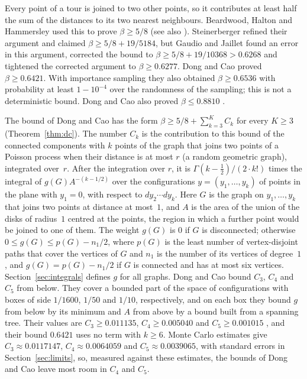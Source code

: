 \documentclass[11pt]{amsart}
\theoremstyle{definition}
\theoremstyle{remark}
\numberwithin{equation}{section}
\newcommand{\MCThree}{0.0117147}
\newcommand{\MCFour}{0.0064059}
\newcommand{\MCFive}{0.0039065}
\begin{document}
Every point of a tour is joined to two other points, so it contributes at least half the sum of the distances to its two nearest neighbours. Beardwood, Halton and Hammersley used this to prove $\beta\ge5/8$ \cite{BHH59} (see also \cite[Section~3.1]{Ste15}). Steinerberger \cite{Ste15} refined their argument and claimed $\beta\ge5/8+19/5184$, but Gaudio and Jaillet \cite{GJ20} found an error in this argument, corrected the bound to $\beta\ge5/8+19/10368>0.6268$ and tightened the corrected argument to $\beta\ge0.6277$. Dong and Cao \cite{DC26} proved $\beta\ge0.6421$. With importance sampling they also obtained $\beta\ge0.6536$ with probability at least $1-10^{-4}$ over the randomness of the sampling; this is not a deterministic bound. Dong and Cao also proved $\beta\le0.8810$ \cite{DC26}.

The bound of Dong and Cao has the form $\beta\ge5/8+\sum_{k=3}^{K}C_k$ for every $K\ge3$ (Theorem~\ref{thm:dc}). The number $C_k$ is the contribution to this bound of the connected components with $k$ points of the graph that joins two points of a Poisson process when their distance is at most $r$ (a random geometric graph), integrated over~$r$. After the integration over $r$, it is $\Gamma(k-\frac12)/(2\cdot k!)$ times the integral of $g(G)A^{-(k-1/2)}$ over the configurations $y=(y_1,\dots,y_k)$ of points in the plane with $y_1=0$, with respect to $dy_2\cdots dy_k$. Here $G$ is the graph on $y_1,\dots,y_k$ that joins two points at distance at most~$1$, and $A$ is the area of the union of the disks of radius~$1$ centred at the points, the region in which a further point would be joined to one of them. The weight $g(G)$ is $0$ if $G$ is disconnected; otherwise $0\le g(G)\le p(G)-n_1/2$, where $p(G)$ is the least number of vertex-disjoint paths that cover the vertices of $G$ and $n_1$ is the number of its vertices of degree~$1$, and $g(G)=p(G)-n_1/2$ if $G$ is connected and has at most six vertices. Section~\ref{sec:integrals} defines $g$ for all graphs. Dong and Cao bound $C_3$, $C_4$ and $C_5$ from below. They cover a bounded part of the space of configurations with boxes of side $1/1600$, $1/50$ and $1/10$, respectively, and on each box they bound $g$ from below by its minimum and $A$ from above by a bound built from a spanning tree. Their values are $C_3\ge0.011135$, $C_4\ge0.005040$ and $C_5\ge0.001015$ \cite[Section~3.3]{DC26}, and their bound $0.6421$ uses no term with $k\ge6$. Monte Carlo estimates give $C_3\approx\MCThree$, $C_4\approx\MCFour$ and $C_5\approx\MCFive$, with standard errors in Section~\ref{sec:limits}, so, measured against these estimates, the bounds of Dong and Cao leave most room in $C_4$ and $C_5$.
\end{document}
